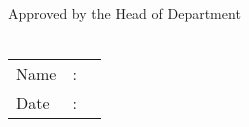 \vspace{3\baselineskip}

\begin{minipage}[b]{.5\textwidth}
~
\end{minipage}%
\begin{minipage}[b]{.5\textwidth}
	\raggedleft
	
	Approved by the Head of Department\\
	{\bfseries\theprogramme} \\[2\baselineskip]
	
		\begin{tabular}{lcl}
		Name & : & \thehod	\\
		Date  & : &  \\
	\end{tabular}
\end{minipage}

\endgroup
\raggedbottom
\cleardoublepage
%
%  